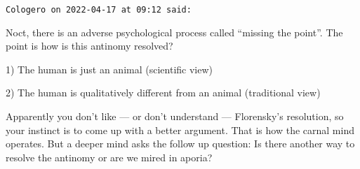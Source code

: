 \begin{footnotesize}
\begin{sffamily}
\hfill

\texttt{Cologero on 2022-04-17 at 09:12 said:}

Noct, there is an adverse psychological process called ``missing the point''. The point is how is this antinomy resolved?

1) The human is just an animal (scientific view)

2) The human is qualitatively different from an animal (traditional view)

Apparently you don't like --- or don't understand --- Florensky's resolution, so your instinct is to come up with a better argument. That is how the carnal mind operates. But a deeper mind asks the follow up question: Is there another way to resolve the antinomy or are we mired in aporia?

\end{sffamily}
\end{footnotesize}

